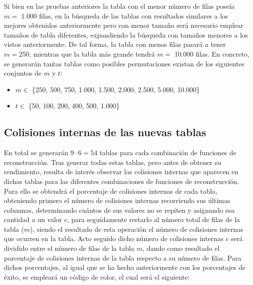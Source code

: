 \documentclass[12pt,spanish,listoffigures,listoftables,listofalgorithms]{tfgetsinf}
\begin{document}
Si bien en las pruebas anteriores la tabla con el menor número de filas poseía $m =$ 1.000 filas, en la búsqueda de las tablas con resultados similares a los mejores obtenidos anteriormente pero con menor tamaño será necesario emplear tamaños de tabla diferentes, expandiendo la búsqueda con tamaños menores a los vistos anteriormente. De tal forma, la tabla con menos filas pasará a tener $m = 250$, mientras que la tabla más grande tendrá $m =$ 10.000 filas. En concreto, se generarán tantas tablas como posibles permutaciones existan de los siguientes conjuntos de $m$ y $t$:
\\
\begin{itemize}

    \item $m \in$ \{250, 500, 750, 1.000, 1.500, 2.000, 2.500, 5.000, 10.000\}
    
    \item $t \in$ \{50, 100, 200, 400, 500, 1.000\}
    
\end{itemize}

\subsection{Colisiones internas de las nuevas tablas}

En total se generarán $9 \cdot 6 = 54$ tablas para cada combinación de funciones de reconstrucción. Tras generar todas estas tablas, pero antes de obtener su rendimiento, resulta de interés observar las colisiones internas que aparecen en dichas tablas para las diferentes combinaciones de funciones de reconstrucción. Para ello se obtendrá el porcentaje de colisiones internas de cada tabla, obteniendo primero el número de colisiones internas recorriendo sus últimas columnas, determinando cuántos de sus valores no se repiten y asignando esa cantidad a un valor $c$, para seguidamente restarlo al número total de filas de la tabla ($m$), siendo el resultado de esta operación el número de colisiones internas que ocurren en la tabla. Acto seguido dicho número de colisiones internas $c$ será dividido entre el número de filas de la tabla $m$, dando como resultado el porcentaje de colisiones internas de la tabla respecto a su número de filas. Para dichos porcentajes, al igual que se ha hecho anteriormente con los porcentajes de éxito, se empleará un código de color, el cual será el siguiente:
\end{document}
